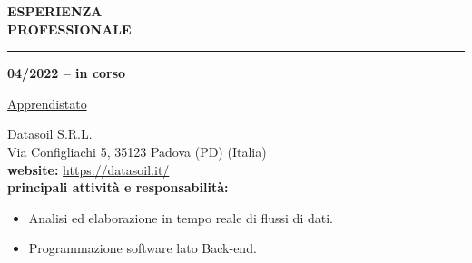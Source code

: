 \hspace{5mm}
\begin{minipage}[b]{0.3\textwidth}
	\textbf{ESPERIENZA \\PROFESSIONALE}
\end{minipage}%
\hfill
\hfill
\begin{minipage}[t]{0.6\textwidth}		
	\rule{\textwidth}{0.4pt}
\end{minipage}%
\vspace{5mm}


\begin{minipage}[t]{0.3\textwidth}
	\textbf{04/2022 – in corso}
\end{minipage}%
\hfill
\hfill
\begin{minipage}[t]{0.6\textwidth}		
	\begin{Large}
		\underline{Apprendistato} \vspace{1mm}\\
	\end{Large} 
		Datasoil S.R.L. \\
		Via Configliachi 5, 35123 Padova (PD) (Italia)\\
		\textbf{website:} \url{https://datasoil.it/} \vspace{1mm}\\
		\textbf{principali attività e responsabilità:}
		\begin{itemize}
			\item Analisi ed elaborazione in tempo reale di flussi di dati.
			\item Programmazione software lato Back-end.
		\end{itemize}
	\vspace{4mm}
\end{minipage}%
\\